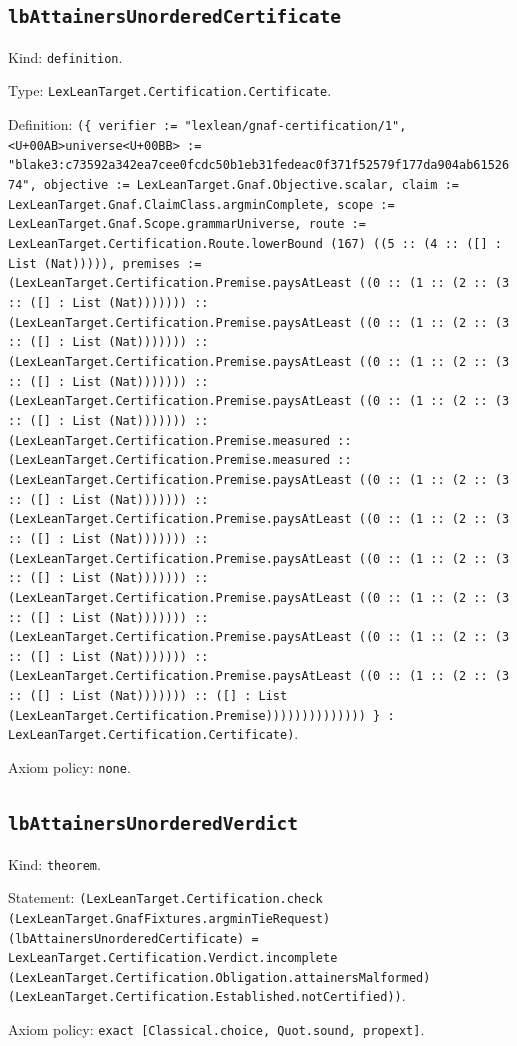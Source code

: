 \documentclass[11pt]{article}
\begin{document}
\subsection*{\texttt{lbAttainersUnorderedCertificate}}
\noindent Kind: \texttt{definition}.\par
\noindent Type: \texttt{LexLeanTarget.Certification.Certificate}.\par
\noindent Definition: \texttt{(\{ verifier := "lexlean/gnaf-certification/1", <U+00AB>universe<U+00BB> := "blake3:c73592a342ea7cee0fcdc50b1eb31fedeac0f371f52579f177da904ab6152674", objective := LexLeanTarget.Gnaf.Objective.scalar, claim := LexLeanTarget.Gnaf.ClaimClass.argminComplete, scope := LexLeanTarget.Gnaf.Scope.grammarUniverse, route := LexLeanTarget.Certification.Route.lowerBound (167) ((5 :: (4 :: ([] : List (Nat))))), premises := (LexLeanTarget.Certification.Premise.paysAtLeast ((0 :: (1 :: (2 :: (3 :: ([] : List (Nat))))))) :: (LexLeanTarget.Certification.Premise.paysAtLeast ((0 :: (1 :: (2 :: (3 :: ([] : List (Nat))))))) :: (LexLeanTarget.Certification.Premise.paysAtLeast ((0 :: (1 :: (2 :: (3 :: ([] : List (Nat))))))) :: (LexLeanTarget.Certification.Premise.paysAtLeast ((0 :: (1 :: (2 :: (3 :: ([] : List (Nat))))))) :: (LexLeanTarget.Certification.Premise.measured :: (LexLeanTarget.Certification.Premise.measured :: (LexLeanTarget.Certification.Premise.paysAtLeast ((0 :: (1 :: (2 :: (3 :: ([] : List (Nat))))))) :: (LexLeanTarget.Certification.Premise.paysAtLeast ((0 :: (1 :: (2 :: (3 :: ([] : List (Nat))))))) :: (LexLeanTarget.Certification.Premise.paysAtLeast ((0 :: (1 :: (2 :: (3 :: ([] : List (Nat))))))) :: (LexLeanTarget.Certification.Premise.paysAtLeast ((0 :: (1 :: (2 :: (3 :: ([] : List (Nat))))))) :: (LexLeanTarget.Certification.Premise.paysAtLeast ((0 :: (1 :: (2 :: (3 :: ([] : List (Nat))))))) :: (LexLeanTarget.Certification.Premise.paysAtLeast ((0 :: (1 :: (2 :: (3 :: ([] : List (Nat))))))) :: ([] : List (LexLeanTarget.Certification.Premise)))))))))))))) \} : LexLeanTarget.Certification.Certificate)}.\par
\noindent Axiom policy: \texttt{none}.\par
\subsection*{\texttt{lbAttainersUnorderedVerdict}}
\noindent Kind: \texttt{theorem}.\par
\noindent Statement: \texttt{(LexLeanTarget.Certification.check (LexLeanTarget.GnafFixtures.argminTieRequest) (lbAttainersUnorderedCertificate) = LexLeanTarget.Certification.Verdict.incomplete (LexLeanTarget.Certification.Obligation.attainersMalformed) (LexLeanTarget.Certification.Established.notCertified))}.\par
\noindent Axiom policy: \texttt{exact [Classical.choice, Quot.sound, propext]}.\par
\end{document}
